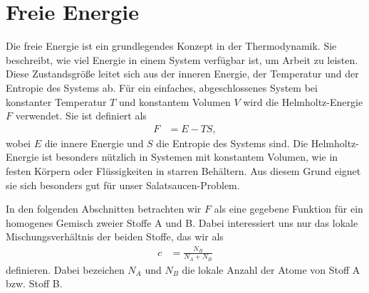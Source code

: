 %
%
%
%
\section{Freie Energie\label{cahnhilliard:section:energie}}

Die freie Energie ist ein grundlegendes Konzept in der Thermodynamik.
Sie beschreibt,
wie viel Energie in einem System verfügbar ist,
um Arbeit zu leisten.
Diese Zustandsgröße leitet sich aus der inneren Energie,
der Temperatur und der Entropie des Systems ab.
Für ein einfaches,
abgeschlossenes System bei konstanter Temperatur $T$
und konstantem Volumen $V$ wird die Helmholtz-Energie $F$ verwendet.
Sie ist definiert als
\begin{align*}
F
& =
E - TS,
\end{align*}
wobei $E$ die innere Energie und $S$ die Entropie des Systems sind.
Die Helmholtz-Energie ist besonders nützlich in Systemen mit konstantem Volumen,
wie in festen Körpern oder Flüssigkeiten in starren Behältern.
Aus diesem Grund eignet sie sich besonders gut für unser Salatsaucen-Problem.

In den folgenden Abschnitten betrachten wir $F$ als eine gegebene Funktion
für ein homogenes Gemisch zweier Stoffe A und B.
Dabei interessiert uns nur das lokale Mischungsverhältnis der beiden Stoffe,
das wir als
\begin{align*}
c
& =
\frac{N_B}{N_A + N_B}
\end{align*}
definieren.
Dabei bezeichen $N_A$ und $N_B$ die lokale Anzahl der Atome von Stoff A bzw. Stoff B.

